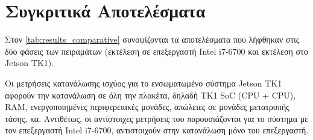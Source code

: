 \section{Συγκριτικά Αποτελέσματα}
\label{sec:experiments_comparative}

Στον \autoref{tab:results_comparative} συνοψίζονται τα αποτελέσματα που λήφθηκαν στις δύο φάσεις
των πειραμάτων (εκτέλεση σε επεξεργαστή Intel i7-6700 και εκτέλεση στο Jetson TK1).

Οι μετρήσεις κατανάλωσης ισχύος για το ενσωματωμένο σύστημα Jetson TK1 αφορούν την
κατανάλωση σε όλη την πλακέτα, δηλαδή TK1 SoC (CPU + CPU), RAM, ενεργοποιημένες περιφερειακές μονάδες,
απώλειες σε μονάδες μετατροπής τάσης, κα.
Αντιθέτως, οι αντίστοιχες μετρήσεις του παρουσιάζονται για το σύστημα με τον
επεξεργαστή Intel i7-6700, αντιστοιχούν στην κατανάλωση μόνο του επεξεργαστή.


